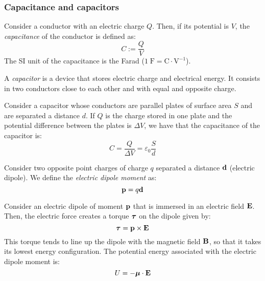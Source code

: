 \documentclass[../../../main.tex]{subfiles}
\begin{document}
\begin{multicols}{2}
    \subsubsection*{Capacitance and capacitors}
    \begin{definition}[Capacitance]
        Consider a conductor with an electric charge $Q$. Then, if its potential is $V$, the \textit{capacitance} of the conductor is defined as: $$C:=\frac{Q}{V}$$
        The SI unit of the capacitance is the Farad ($1\;\text{F}=\text{C}\cdot\text{V}^{-1}$).
    \end{definition}
    \begin{definition}[Capacitor]
        A \textit{capacitor} is a device that stores electric charge and electrical energy. It consists in two conductors close to each other and with equal and opposite charge.
    \end{definition}
    \begin{prop}
        Consider a capacitor whose conductors are parallel plates of surface area $S$ and are separated a distance $d$. If $Q$ is the charge stored in one plate and the  potential difference between the plates is $\Delta V$, we have that the capacitance of the capacitor is: $$C=\frac{Q}{\Delta V}=\varepsilon_0\frac{S}{d}$$
    \end{prop}
    \begin{definition}
        Consider two opposite point charges of charge $q$ separated a distance $\boldsymbol{\mathrm{d}}$ (electric dipole). We define the \textit{electric dipole moment} as: $$\boldsymbol{\mathrm{p}}=q\boldsymbol{\mathrm{d}}$$
    \end{definition}
    \begin{prop}
        Consider an electric dipole of moment $\boldsymbol{\mathrm{p}}$ that is immersed in an electric field $\boldsymbol{\mathrm{E}}$. Then, the electric force creates a torque $\vb*{\tau}$ on the dipole given by: $$\vb*{\tau}=\boldsymbol{\mathrm{p}}\times\boldsymbol{\mathrm{E}}$$ This torque tends to line up the dipole with the magnetic field $\boldsymbol{\mathrm{B}}$, so that it takes its lowest energy configuration. The potential energy associated with the electric dipole moment is: $$U=-\vb*{\mu}\cdot\boldsymbol{\mathrm{E}}$$
    \end{prop}
    \begin{center}
        \begin{minipage}{\linewidth}
            \centering
            

\end{minipage}
\end{center}
\end{multicols}
\end{document}
